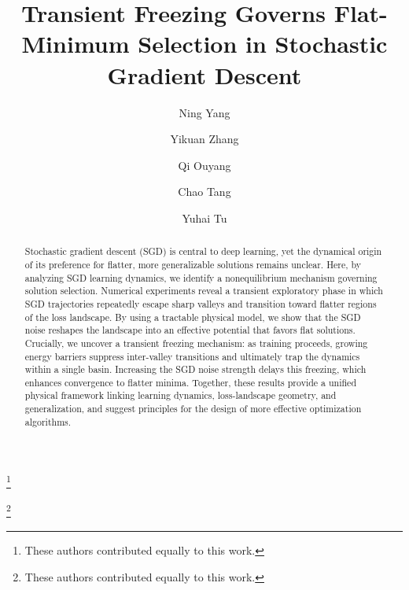 \documentclass[aps,prx,reprint,superscriptaddress,longbibliography,nofootinbib,floatfix]{revtex4-2}
\begin{document}
\title{Transient Freezing Governs Flat-Minimum Selection in Stochastic Gradient Descent}

\author{Ning Yang}
\thanks{These authors contributed equally to this work.}

\author{Yikuan Zhang}
\thanks{These authors contributed equally to this work.}

\author{Qi Ouyang}

\author{Chao Tang}

\author{Yuhai Tu}

\begin{abstract}
    Stochastic gradient descent (SGD) is central to deep learning, yet the dynamical origin of its preference for flatter, more generalizable solutions remains unclear. Here, by analyzing SGD learning dynamics, we identify a nonequilibrium mechanism governing solution selection. Numerical experiments reveal a transient exploratory phase in which SGD trajectories repeatedly escape sharp valleys and transition toward flatter regions of the loss landscape. By using a tractable physical model, we show that the SGD noise reshapes the landscape into an effective potential that favors flat solutions. Crucially, we uncover a transient freezing mechanism: as training proceeds, growing energy barriers suppress inter-valley transitions and ultimately trap the dynamics within a single basin. Increasing the SGD noise strength delays this freezing, which enhances convergence to flatter minima. Together, these results provide a unified physical framework linking learning dynamics, loss-landscape geometry, and generalization, and suggest principles for the design of more effective optimization algorithms.
\end{abstract}

\maketitle
\end{document}
